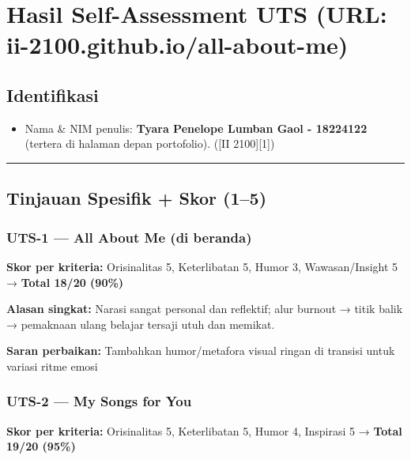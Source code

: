 \documentclass[
  letterpaper,
  DIV=11,
  numbers=noendperiod]{scrreprt}
\providecommand{\tightlist}{%
  \setlength{\itemsep}{0pt}\setlength{\parskip}{0pt}}
\begin{document}

\chapter{Hasil Self-Assessment UTS (URL:
ii-2100.github.io/all-about-me)}\label{hasil-self-assessment-uts-url-ii-2100.github.ioall-about-me}

\section{Identifikasi}\label{identifikasi}

\begin{itemize}
\tightlist
\item
  Nama \& NIM penulis: \textbf{Tyara Penelope Lumban Gaol - 18224122}
  (tertera di halaman depan portofolio). ({[}II 2100{]}{[}1{]})
\end{itemize}

\begin{center}\rule{0.5\linewidth}{0.5pt}\end{center}

\section{Tinjauan Spesifik + Skor
(1--5)}\label{tinjauan-spesifik-skor-15}

\subsection{UTS-1 --- All About Me (di
beranda)}\label{uts-1-all-about-me-di-beranda}

\textbf{Skor per kriteria:} Orisinalitas 5, Keterlibatan 5, Humor 3,
Wawasan/Insight 5 → \textbf{Total 18/20 (90\%)}

\textbf{Alasan singkat:} Narasi sangat personal dan reflektif; alur
burnout → titik balik → pemaknaan ulang belajar tersaji utuh dan
memikat.

\textbf{Saran perbaikan:} Tambahkan humor/metafora visual ringan di
transisi untuk variasi ritme emosi

\subsection{UTS-2 --- My Songs for You}\label{uts-2-my-songs-for-you}

\textbf{Skor per kriteria:} Orisinalitas 5, Keterlibatan 5, Humor 4,
Inspirasi 5 → \textbf{Total 19/20 (95\%)}
\end{document}
